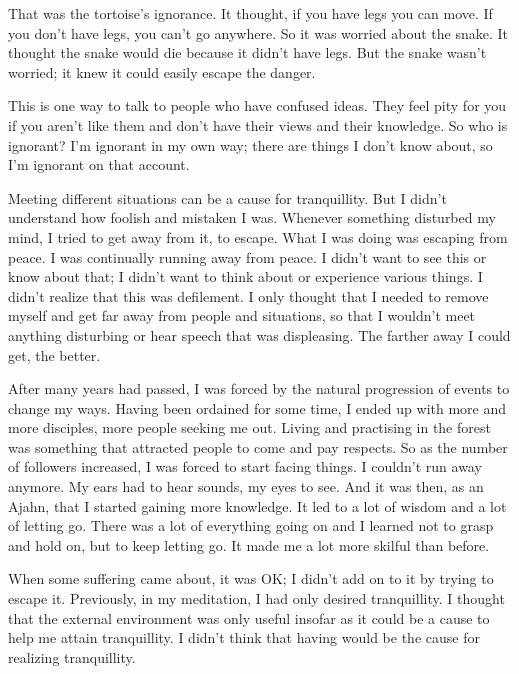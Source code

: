 That was the tortoise's ignorance. It thought, if you have legs you can move. If you don't have legs, you can't go anywhere. So it was worried about the snake. It thought the snake would die because it didn't have legs. But the snake wasn't worried; it knew it could easily escape the danger. 

This is one way to talk to people who have confused ideas. They feel pity for you if you aren't like them and don't have their views and their knowledge. So who is ignorant? I'm ignorant in my own way; there are things I don't know about, so I'm ignorant on that account. 

Meeting different situations can be a cause for tranquillity. But I didn't understand how foolish and mistaken I was. Whenever something disturbed my mind, I tried to get away from it, to escape. What I was doing was escaping from peace. I was continually running away from peace. I didn't want to see this or know about that; I didn't want to think about or experience various things. I didn't realize that this was defilement. I only thought that I needed to remove myself and get far away from people and situations, so that I wouldn't meet anything disturbing or hear speech that was displeasing. The farther away I could get, the better. 

After many years had passed, I was forced by the natural progression of events to change my ways. Having been ordained for some time, I ended up with more and more disciples, more people seeking me out. Living and practising in the forest was something that attracted people to come and pay respects. So as the number of followers increased, I was forced to start facing things. I couldn't run away anymore. My ears had to hear sounds, my eyes to see. And it was then, as an Ajahn, that I started gaining more knowledge. It led to a lot of wisdom and a lot of letting go. There was a lot of everything going on and I learned not to grasp and hold on, but to keep letting go. It made me a lot more skilful than before. 

When some suffering came about, it was OK; I didn't add on to it by trying to escape it. Previously, in my meditation, I had only desired tranquillity. I thought that the external environment was only useful insofar as it could be a cause to help me attain tranquillity. I didn't think that having  would be the cause for realizing tranquillity. 

